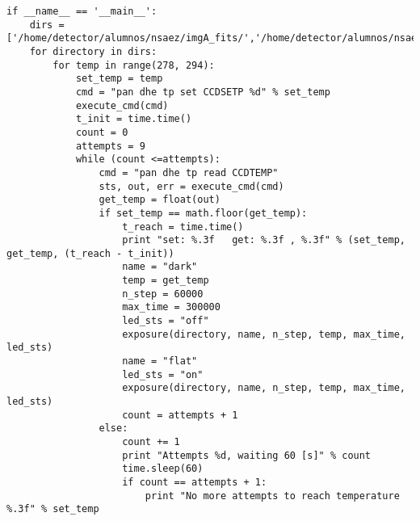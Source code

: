 \documentclass[a4paper,10pt]{article}
\begin{document}
{\begin{verbatim}
if __name__ == '__main__':
    dirs = ['/home/detector/alumnos/nsaez/imgA_fits/','/home/detector/alumnos/nsaez/imgB_fits/','/home/detector/alumnos/nsaez/imgC_fits/']
    for directory in dirs:
        for temp in range(278, 294):
            set_temp = temp
            cmd = "pan dhe tp set CCDSETP %d" % set_temp
            execute_cmd(cmd)
            t_init = time.time()
            count = 0
            attempts = 9
            while (count <=attempts):
                cmd = "pan dhe tp read CCDTEMP"
                sts, out, err = execute_cmd(cmd)
                get_temp = float(out)
                if set_temp == math.floor(get_temp):
                    t_reach = time.time()
                    print "set: %.3f   get: %.3f , %.3f" % (set_temp, get_temp, (t_reach - t_init))
                    name = "dark"
                    temp = get_temp
                    n_step = 60000
                    max_time = 300000
                    led_sts = "off"
                    exposure(directory, name, n_step, temp, max_time, led_sts)
                    name = "flat"
                    led_sts = "on"
                    exposure(directory, name, n_step, temp, max_time, led_sts)
                    count = attempts + 1
                else:
                    count += 1
                    print "Attempts %d, waiting 60 [s]" % count
                    time.sleep(60)
                    if count == attempts + 1:
                        print "No more attempts to reach temperature %.3f" % set_temp 
    
\end{verbatim}
}
\end{document}
